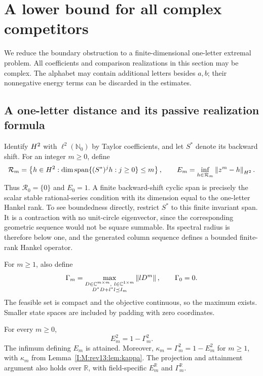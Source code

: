 \section{A lower bound for all complex competitors}
\label{I:B:sec:complex-lower}

We reduce the boundary obstruction to a finite-dimensional one-letter
extremal problem. All coefficients and comparison realizations in this
section may be complex. The alphabet may contain additional letters besides
$a,b$; their nonnegative energy terms can be discarded in the estimates.

\subsection{A one-letter distance and its passive realization formula}

Identify $H^2$ with $\ell^2(\mathbb N_0)$ by Taylor coefficients, and let
$S^*$ denote its backward shift. For an integer $m\ge0$, define
\[
 \mathcal R_m=\left\{h\in H^2:
 \dim\operatorname{span}\{(S^*)^j h:j\ge0\}\le m\right\},
 \qquad
 E_m=\inf_{h\in\mathcal R_m}\left\lVert z^m-h\right\rVert_{H^2}.
\]
Thus $\mathcal R_0=\{0\}$ and $E_0=1$. A finite backward-shift cyclic
span is precisely the scalar stable rational-series condition with its
dimension equal to the one-letter Hankel rank. To see boundedness directly,
restrict $S^*$ to this finite invariant span. It is a contraction with no
unit-circle eigenvector, since the corresponding geometric sequence would
not be square summable. Its spectral radius is therefore below one, and
the generated column sequence defines a bounded finite-rank Hankel operator.

For $m\ge1$, also define
\begin{equation}
 \Gamma_m=
 \max_{\substack{D\in\mathbb C^{m\times m},\ l\in\mathbb C^{1\times m}\\
                 D^*D+l^*l\preceq I_m}}
              \left\lVert lD^m\right\rVert,
 \qquad \Gamma_0=0.
 \label{I:B:eq:passive-gamma}
\end{equation}
The feasible set is compact and the objective continuous, so the maximum
exists. Smaller state spaces are included by padding with zero coordinates.

\begin{lemma}
\label{I:B:lem:one-letter-projection}
For every $m\ge0$,
\begin{equation}
 E_m^2=1-\Gamma_m^2.
 \label{I:B:eq:E-gamma}
\end{equation}
The infimum defining $E_m$ is attained. Moreover,
$\kappa_m=\Gamma_m^2=1-E_m^2$ for $m\ge1$, with $\kappa_m$ from Lemma~\ref{I:M:rev13:lem:kappa}.
The projection and attainment argument also holds over $\mathbb R$, with field-specific $E_m^{\mathbb R}$ and $\Gamma_m^{\mathbb R}$.
\end{lemma}

